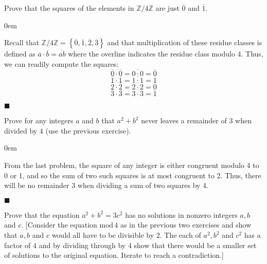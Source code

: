 \documentclass[12pt]{article}
\renewcommand{\qed}{\hfill$\blacksquare$}
\renewenvironment{proof}{\begin{addmargin}[1em]{0em}\begin{newproof}}{\end{newproof}\end{addmargin}\qed}
\newenvironment{problem}[2][Exercise]{\begin{trivlist}
\item[\hskip \labelsep {\bfseries #1}\hskip \labelsep {\bfseries #2.}]}{\end{trivlist}}
\begin{document}
\begin{problem}{0.3.6}
Prove that the squares of the elements in $\mathbb{Z}/4\mathbb{Z}$ are just $\overline{0}$ and $\overline{1}$.
\end{problem}
\begin{proof}
Recall that $\mathbb{Z}/4\mathbb{Z} = \left\{ \overline{0},\overline{1},\overline{2},\overline{3}\right\}$ and that multiplication of these residue classes is defined as $\overline{a}\cdot\overline{b} = \overline{ab}$ where the overline indicates the residue class modulo 4. Thus, we can readily compute the squares: \[ \overline{0}\cdot\overline{0}=\overline{0\cdot 0}=\overline{0} \] \[ \overline{1}\cdot\overline{1}=\overline{1\cdot1} = \overline{1} \] \[ \overline{2}\cdot\overline{2} = \overline{2\cdot2}=\overline{0} \] \[ \overline{3}\cdot\overline{3}=\overline{3\cdot3}=\overline{1} \]
\end{proof}




\begin{problem}{0.3.7}
Prove for any integers $a$ and $b$ that $a^2+b^2$ never leaves a remainder of $3$ when divided by $4$ (use the previous exercise).
\end{problem}
\begin{proof}
From the last problem, the square of any integer is either congruent modulo 4 to 0 or 1, and so the sum of two such squares is at most congruent to 2. Thus, there will be no remainder 3 when dividing a sum of two squares by 4.
\end{proof}



\begin{problem}{0.3.8}
Prove that the equation $a^2+b^2 = 3c^2$ has no solutions in nonzero integers $a,b$ and $c$. [Consider the equation $\text{mod}\, 4$ as in the previous two exercises and show that $a,b$ and $c$ would all have to be divisible by $2$. The each of $a^2,b^2$ and $c^2$ has a factor of $4$ and by dividing through by $4$ show that there would be a smaller set of solutions to the original equation. Iterate to reach a contradiction.]
\end{problem}
\end{document}
